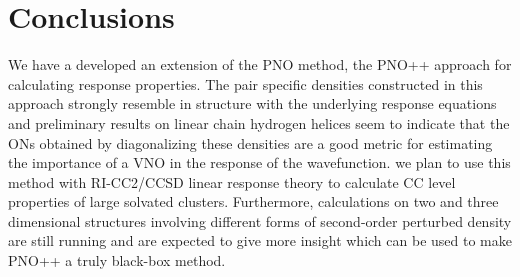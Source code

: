 \section{Conclusions}
We have a developed an extension of the PNO method, the PNO++ 
approach for calculating response properties. The pair 
specific densities constructed in this approach strongly
resemble in structure with the underlying response equations
and preliminary results on linear chain hydrogen helices
seem to indicate that the ONs obtained by diagonalizing these densities
are a good metric for estimating the importance of a
VNO in the response of the wavefunction. we plan to use this
method with RI-CC2/CCSD linear response theory to calculate  
CC level properties of large solvated clusters.
Furthermore, calculations on two and three dimensional structures 
involving different forms of second-order perturbed density 
are still running and are expected to give more insight
which can be used to make PNO++ a truly black-box method.



